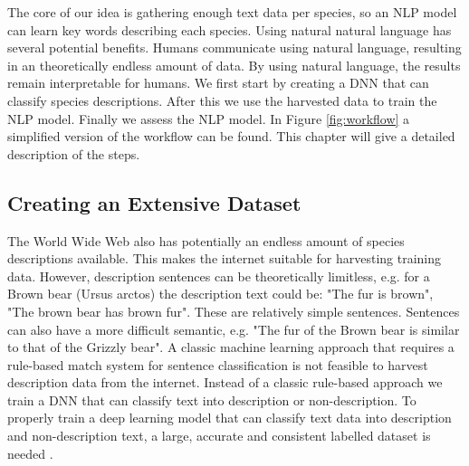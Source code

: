 \documentclass[a4paper, 12pt, oneside]{book} %
\begin{document}
The core of our idea is gathering enough text data per species, so an NLP model can learn key words describing each species.
Using natural natural language has several potential benefits.
Humans communicate using natural language, resulting in an theoretically endless amount of data.
By using natural language, the results remain interpretable for humans.
We first start by creating a DNN that can classify species descriptions.
After this we use the harvested data to train the NLP model.
Finally we assess the NLP model.
In Figure \ref{fig:workflow} a simplified version of the workflow can be found.
This chapter will give a detailed description of the steps.

\subsection{Creating an Extensive Dataset} \label{par:dataset}
The World Wide Web also has potentially an endless amount of species descriptions available.
This makes the internet suitable for harvesting training data.
However, description sentences can be theoretically limitless, e.g. for a Brown bear (Ursus arctos) the description text could be: "The fur is brown", "The brown bear has brown fur".
These are relatively simple sentences.
Sentences can also have a more difficult semantic, e.g. "The fur of the Brown bear is similar to that of the Grizzly bear".
A classic machine learning approach that requires a rule-based match system for sentence classification is not feasible to harvest description data from the internet.
Instead of a classic rule-based approach we train a DNN that can classify text into description or non-description.
To properly train a deep learning model that can classify text data into description and non-description text, a large, accurate and consistent labelled dataset is needed \autocite{munappy_data_2019}.
\end{document}
